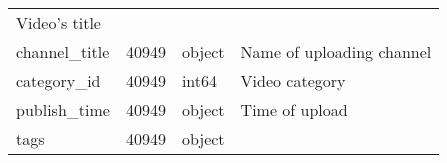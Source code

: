 \documentclass[11pt]{article}
\begin{document}
\begin{longtable}[]{@{}llll@{}}
\begin{minipage}[t]{0.25\columnwidth}
Video's title\strut
\end{minipage}\tabularnewline
\begin{minipage}[t]{0.32\columnwidth}\raggedright
channel\_title\strut
\end{minipage} & \begin{minipage}[t]{0.18\columnwidth}\raggedright
40949\strut
\end{minipage} & \begin{minipage}[t]{0.14\columnwidth}\raggedright
object\strut
\end{minipage} & \begin{minipage}[t]{0.25\columnwidth}\raggedright
Name of uploading channel\strut
\end{minipage}\tabularnewline
\begin{minipage}[t]{0.32\columnwidth}\raggedright
category\_id\strut
\end{minipage} & \begin{minipage}[t]{0.18\columnwidth}\raggedright
40949\strut
\end{minipage} & \begin{minipage}[t]{0.14\columnwidth}\raggedright
int64\strut
\end{minipage} & \begin{minipage}[t]{0.25\columnwidth}\raggedright
Video category\strut
\end{minipage}\tabularnewline
\begin{minipage}[t]{0.32\columnwidth}\raggedright
publish\_time\strut
\end{minipage} & \begin{minipage}[t]{0.18\columnwidth}\raggedright
40949\strut
\end{minipage} & \begin{minipage}[t]{0.14\columnwidth}\raggedright
object\strut
\end{minipage} & \begin{minipage}[t]{0.25\columnwidth}\raggedright
Time of upload\strut
\end{minipage}\tabularnewline
\begin{minipage}[t]{0.32\columnwidth}\raggedright
tags\strut
\end{minipage} & \begin{minipage}[t]{0.18\columnwidth}\raggedright
40949\strut
\end{minipage} & \begin{minipage}[t]{0.14\columnwidth}\raggedright
object\strut
\end{minipage} & \begin{minipage}[t]{0.25\columnwidth}\raggedright

\end{minipage}
\end{longtable}
\end{document}
